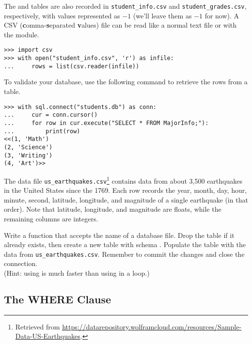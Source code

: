 \begin{problem}
The  and  tables are also recorded in \texttt{student\_info.csv} and \texttt{student\_grades.csv}, respectively, with  values represented as $-1$ (we'll leave them as $-1$ for now).
A CSV (\textbf{c}omma-\textbf{s}eparated \textbf{v}alues) file can be read like a normal text file or with the  module.

\begin{lstlisting}
>>> import csv
>>> with open("student_info.csv", 'r') as infile:
...     rows = list(csv.reader(infile))
\end{lstlisting}

To validate your database, use the following command to retrieve the rows from a table.

\begin{lstlisting}
>>> with sql.connect("students.db") as conn:
...     cur = conn.cursor()
...     for row in cur.execute("SELECT * FROM MajorInfo;"):
...         print(row)
<<(1, 'Math')
(2, 'Science')
(3, 'Writing')
(4, 'Art')>>
\end{lstlisting}
\label{prob:sql1-populate-students}
\end{problem}

\begin{problem}
The data file \texttt{us\_earthquakes.csv}\footnote{Retrieved from \url{https://datarepository.wolframcloud.com/resources/Sample-Data-US-Earthquakes}.} contains data from about 3,500 earthquakes in the United States since the 1769.
Each row records the year, month, day, hour, minute, second, latitude, longitude, and magnitude of a single earthquake (in that order).
Note that latitude, longitude, and magnitude are floats, while the remaining columns are integers.

Write a function that accepts the name of a database file.
Drop the table  if it already exists, then create a new  table with schema .
Populate the table with the data from \texttt{us\_earthquakes.csv}.
Remember to commit the changes and close the connection.
\\ (Hint: using  is much faster than using  in a loop.)
\label{prob:sql1-create-earthquakes}
\end{problem}

\subsection*{The WHERE Clause} %

